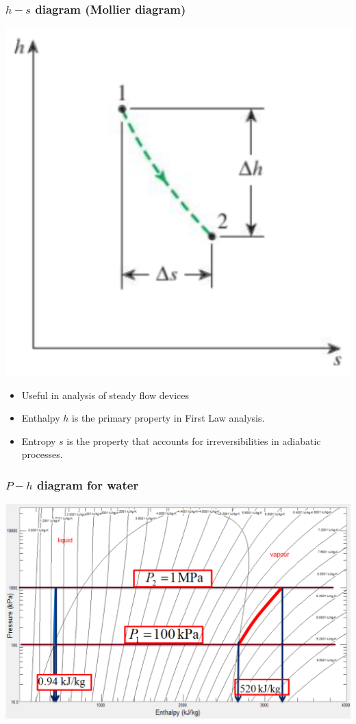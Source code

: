 \documentclass[11pt]{article}
\begin{document}
\subsubsection{\(h-s\) diagram (Mollier diagram)}
\label{sec:orgdd8d790}
\begin{center}
\includegraphics[scale=1]{./images/h-s-diagram.png}
\end{center}

\begin{itemize}
\item Useful in analysis of steady flow devices
\item Enthalpy \(h\) is the primary property in First Law analysis.
\item Entropy \(s\) is the property that accounts for irreversibilities in adiabatic processes.
\end{itemize}
\subsubsection{\(P-h\) diagram for water}
\label{sec:orge763529}
\begin{center}
\includegraphics[width=.9\linewidth]{./images/P-h-diagram-for-water.png}
\end{center}
\end{document}
